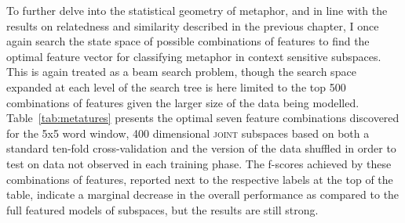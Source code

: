 To further delve into the statistical geometry of metaphor, and in line with the results on relatedness and similarity described in the previous chapter, I once again search the state space of possible combinations of features to find the optimal feature vector for classifying metaphor in context sensitive subspaces.  This is again treated as a beam search problem, though the search space expanded at each level of the search tree is here limited to the top 500 combinations of features given the larger size of the data being modelled.  Table~\ref{tab:metatures} presents the optimal seven feature combinations discovered for the 5x5 word window, 400 dimensional \textsc{joint} subspaces based on both a standard ten-fold cross-validation and the version of the data shuffled in order to test on data not observed in each training phase.  The f-scores achieved by these combinations of features, reported next to the respective labels at the top of the table, indicate a marginal decrease in the overall performance as compared to the full featured models of subspaces, but the results are still strong.

